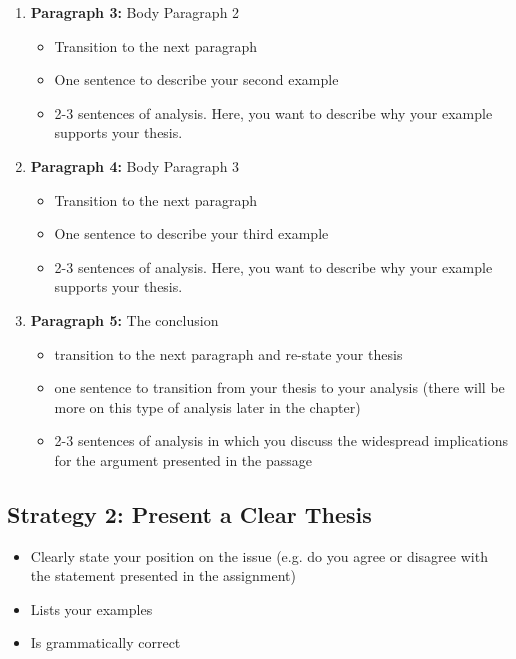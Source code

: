 \begin{enumerate}
\begin{enumerate}
\item \textbf{Paragraph 3:} Body Paragraph 2

\begin{itemize}
\item Transition to the next paragraph
\item One sentence to describe your second example
\item 2-3 sentences of analysis. Here, you want to describe why your example supports your thesis. 
\end{itemize}

\item \textbf{Paragraph 4:} Body Paragraph 3

\begin{itemize}
\item Transition to the next paragraph
\item One sentence to describe your third example
\item 2-3 sentences of analysis. Here, you want to describe why your example supports your thesis. 
\end{itemize}

\item \textbf{Paragraph 5:} The conclusion 

\begin{itemize} 
\item transition to the next paragraph and re-state your thesis
\item one sentence to transition from your thesis to your analysis (there will be more on this type of analysis later in the chapter)
\item 2-3 sentences of analysis in which you discuss the widespread implications for the argument presented in the passage
\end{itemize}
\end{enumerate}

\subsection{Strategy 2: Present a Clear Thesis}

\begin{itemize}
\item Clearly state your position on the issue (e.g. do you agree or disagree with the statement presented in the assignment)
\item Lists your examples
\item Is grammatically correct
\end{itemize}


\end{enumerate}
